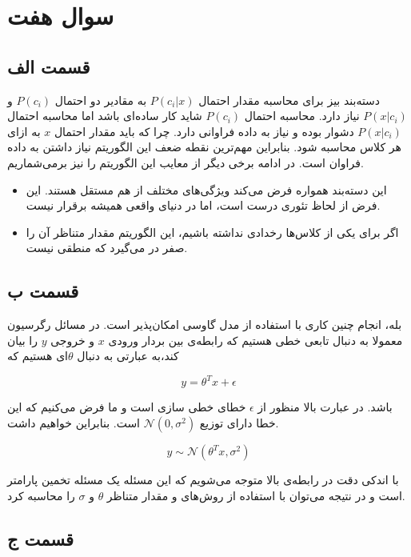 \documentclass{article}
\begin{document}
\section*{سوال هفت}

\subsection*{قسمت الف}

دسته‌بند بیز برای محاسبه مقدار احتمال $P(c_i|x)$ به مقادیر دو احتمال $P(c_i)$ و $P(x|c_i)$ نیاز دارد. محاسبه احتمال $P(c_i)$ شاید کار
ساده‌ای باشد اما محاسبه احتمال $P(x|c_i)$ دشوار بوده و نیاز به داده فراوانی دارد. چرا که باید مقدار احتمال
$x$ به ازای هر کلاس محاسبه شود. بنابراین مهم‌ترین نقطه ضعف این الگوریتم نیاز داشتن به داده فراوان است.
در ادامه برخی دیگر از معایب این الگوریتم را نیز برمی‌شماریم.

\begin{itemize}
    \item این دسته‌بند همواره فرض می‌کند ویژگی‌های مختلف از هم مستقل هستند. این فرض از لحاظ تئوری درست است،
    اما در دنیای واقعی همیشه برقرار نیست.
    \item اگر برای یکی از کلاس‌ها رخدادی نداشته باشیم، این الگوریتم مقدار متناظر آن را صفر در می‌گیرد که منطقی نیست.
\end{itemize}

\subsection*{قسمت ب}

بله، انجام چنین کاری با استفاده از مدل گاوسی امکان‌پذیر است. در مسائل رگرسیون معمولا به دنبال تابعی خطی هستیم
که رابطه‌ی بین بردار ورودی $x$ و خروجی $y$ را بیان کند،به عبارتی به دنبال $\theta$ای هستیم که

$$y = \theta^T x + \epsilon $$

باشد. در عبارت بالا منظور از $\epsilon$ خطای خطی سازی است و ما فرض می‌کنیم که این خطا دارای توزیع
$\mathcal{N} (0, \sigma^2)$ است. بنابراین خواهیم داشت.

$$y \sim \mathcal{N}(\theta^T x, \sigma^2)$$

با اندکی دقت در رابطه‌ی بالا متوجه می‌شویم که این مسئله یک مسئله تخمین پارامتر است و در نتیجه می‌توان با استفاده
از روش‌های  و  مقدار متناظر $\theta$ و $\sigma$ را
محاسبه کرد.

\subsection*{قسمت ج}
\end{document}
